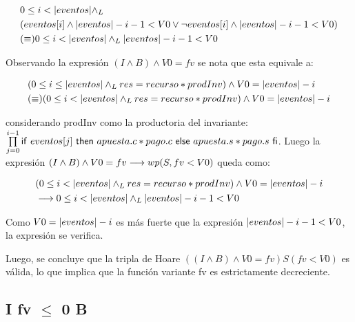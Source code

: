 \documentclass[10pt,a4paper]{article}
\begin{document}
\begin{equation}
\begin{split}
	& 0 \leq i < |eventos| \land _L \\
	& (eventos[i] \land |eventos| -i - 1 < V0 \lor \neg eventos[i] \land |eventos| -i - 1 < V0) \\
	& (\equiv) 0 \leq i < |eventos| \land _L |eventos| -i - 1 < V0
\end{split}
\end{equation}
   
 Observando la expresión $(I \land B) \land V0 = fv$ se nota que esta equivale a:
	
\begin{equation}
\begin{split}
	& (0 \leq i \leq |eventos| \land _L res = recurso * prodInv) \land V0 = |eventos| - i \\
	& (\equiv) (0 \leq i < |eventos| \land _L res = recurso * prodInv) \land V0 = |eventos| - i \\
\end{split}
\end{equation}
	
 considerando prodInv como la productoria del invariante: $\prod\limits_{j=0}^{i-1} \mathsf{if}\ eventos[j]\ \mathsf{then}\ apuesta.c * pago.c\ \mathsf{else}\ apuesta.s * pago.s\ \mathsf{fi}$.
 Luego la expresión $(I \land B) \land V0 = fv \longrightarrow wp(S,fv < V0)$ queda como:
   
\begin{equation}
\begin{split}
	& (0 \leq i < |eventos| \land _L res = recurso * prodInv) \land V0 = |eventos| - i\\
	& \longrightarrow 0 \leq i < |eventos| \land _L |eventos| -i - 1 < V0
\end{split}
\end{equation}
   
 Como $V0 = |eventos| - i$ es más fuerte que la expresión $|eventos| -i - 1 < V0$, la expresión se verifica.
   
\vspace{0.3cm}
   
 Luego, se concluye que la tripla de Hoare $((I \land B) \land V0 = fv)S(fv < V0)$ es válida, lo que implica
 que la función variante fv es estrictamente decreciente.
   
\subsection{I \land fv $\leq$ 0 \implica \neg B}
   
\end{document}
